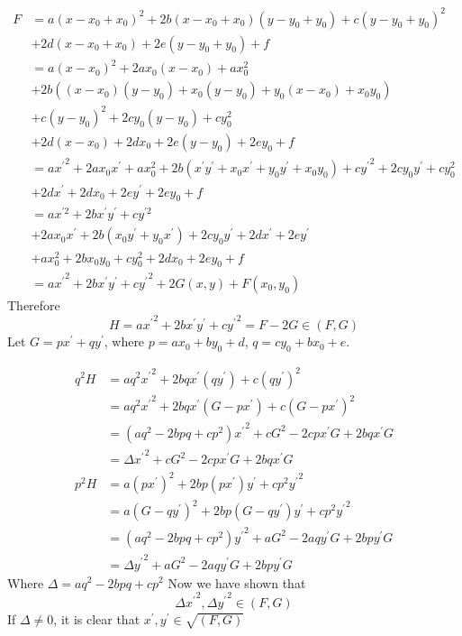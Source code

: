 \documentclass{article}
\begin{document}
\begin{align*}
F &= a(x - x_0 + x_0)^2 + 2b(x - x_0 + x_0)(y - y_0 + y_0) + c(y - y_0 + y_0)^2 \\
  &+ 2d(x - x_0 + x_0) + 2e(y - y_0 + y_0) + f \\
  &= a(x - x_0)^2 + 2ax_0(x - x_0) + ax_0^2 \\
  &+ 2b((x - x_0)(y - y_0) + x_0(y - y_0) + y_0(x - x_0) + x_0y_0) \\
  &+ c(y - y_0)^2 + 2cy_0(y - y_0) + cy_0^2 \\
  &+ 2d(x - x_0) + 2dx_0 + 2e(y - y_0) + 2ey_0 + f \\
  &= a{x^\prime}^2 + 2ax_0x^\prime + ax_0^2 
     + 2b(x^\prime y^\prime + x_0x^\prime + y_0y^\prime + x_0y_0) 
     + c{y^\prime}^2 + 2cy_0y^\prime + cy_0^2 \\
  &+ 2dx^\prime + 2dx_0 + 2ey^\prime + 2ey_0 + f \\
  &= ax^{\prime 2} + 2b x^\prime y^\prime + cy^{\prime 2} \\
  &+ 2ax_0x^\prime + 2b(x_0y^\prime + y_0x^\prime)+ 2cy_0y^\prime + 2dx^\prime + 2ey^\prime \\
  &+ ax_0^2 + 2bx_0y_0 + cy_0^2 + 2dx_0 + 2ey_0 + f \\
  &= a{x^\prime}^2 + 2b x^\prime y^\prime + c{y^\prime}^2 + 2G(x, y) + F(x_0, y_0)
\end{align*}
Therefore
$$H = a{x^\prime}^2 + 2b x^\prime y^\prime + c{y^\prime}^2 = F - 2G \in (F, G)$$
Let $G = px^\prime + qy^\prime$, where $p = ax_0 + by_0 + d$, $q = cy_0 + bx_0 + e$.

\begin{align*}
q^2H &= aq^2{x^\prime}^2 + 2bq x^\prime (qy^\prime) + c(qy^\prime)^2 \\
     &= aq^2{x^\prime}^2 + 2bq x^\prime (G - px^\prime) + c(G - px^\prime)^2 \\
     &= (aq^2 - 2bpq + cp^2) {x^\prime}^2 + cG^2 - 2cpx^\prime G + 2bqx^\prime G \\
     &= \Delta {x^\prime}^2 + cG^2 - 2cpx^\prime G + 2bqx^\prime G \\
p^2H &= a(px^\prime)^2 + 2bp (px^\prime)y^\prime + cp^2{y^\prime}^2 \\
     &= a(G-qy^\prime)^2 + 2bp(G - qy^\prime)y^\prime + cp^2{y^\prime}^2 \\
     &= (aq^2 - 2bpq + cp^2) {y^\prime}^2 + aG^2 - 2aqy^\prime G + 2bpy^\prime G \\
     &= \Delta {y^\prime}^2 + aG^2 - 2aqy^\prime G + 2bpy^\prime G
\end{align*}
Where $\Delta = aq^2 - 2bpq + cp^2$
Now we have shown that 
$$\Delta {x^\prime}^2, \Delta {y^\prime}^2 \in (F, G)$$
If $\Delta \neq 0$, it is clear that $x^\prime, y^\prime \in \sqrt{(F, G)}$
\end{document}
